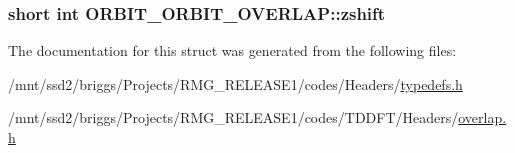 \hypertarget{struct_o_r_b_i_t___o_r_b_i_t___o_v_e_r_l_a_p_af45c072333558da61697126e33b5b7a1}{
\subsubsection[{zshift}]{\setlength{\rightskip}{0pt plus 5cm}short int O\-R\-B\-I\-T\-\_\-\-O\-R\-B\-I\-T\-\_\-\-O\-V\-E\-R\-L\-A\-P\-::zshift}}\label{struct_o_r_b_i_t___o_r_b_i_t___o_v_e_r_l_a_p_af45c072333558da61697126e33b5b7a1}


The documentation for this struct was generated from the following files\-:\begin{DoxyCompactItemize}
\item 
/mnt/ssd2/briggs/\-Projects/\-R\-M\-G\-\_\-\-R\-E\-L\-E\-A\-S\-E1/codes/\-Headers/\hyperlink{_headers_2typedefs_8h}{typedefs.\-h}\item 
/mnt/ssd2/briggs/\-Projects/\-R\-M\-G\-\_\-\-R\-E\-L\-E\-A\-S\-E1/codes/\-T\-D\-D\-F\-T/\-Headers/\hyperlink{overlap_8h}{overlap.\-h}\end{DoxyCompactItemize}
